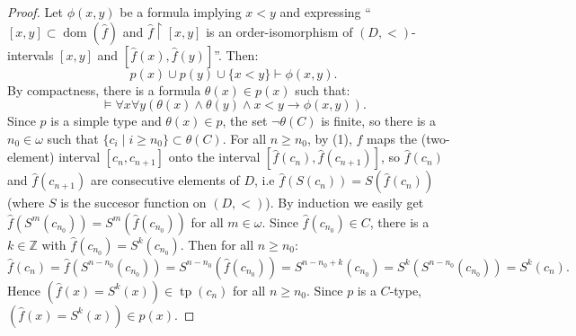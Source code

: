 \documentclass[10pt,a4paper]{amsart}
\theoremstyle{definition}
\DeclareMathOperator{\tp}{tp}
\DeclareMathOperator{\dom}{dom}
\begin{document}
\begin{proof}
Let $\phi(x,y)$ be a formula implying $x<y$ and expressing  ``$[x,y]\subset \dom (\hat f)$ and $\hat f\restriction[x,y]$ is an order-isomorphism of $(D,<)$-intervals $[x,y]$ and $[\hat f(x),\hat f(y)]$''. Then:
$$ p(x)\cup p(y)\cup\{x<y\}\vdash \phi(x,y).$$
By compactness, there is a formula $\theta(x)\in p(x)$   such that:
\begin{equation}
\models  \forall x\forall y  (\theta(x)\land \theta(y)\land x<y\rightarrow \phi(x,y)).
\end{equation}
Since $p$ is a simple type and $\theta(x)\in p$, the set $\lnot\theta(C)$ is finite, so there is a $n_0\in \omega$ such that $\{c_i\mid i\geq n_0\}\subset \theta(C)$. For all $n\geq n_0$, by (1),  $f$ maps the (two-element) interval $[c_n,c_{n+1}]$ onto the interval $[\hat f(c_n),\hat f(c_{n+1})]$, so  
$\hat f(c_n)$ and $\hat f(c_{n+1})$ are consecutive elements of $D$, i.e $\hat f(S(c_n))=S(\hat f(c_n))$ (where $S$ is the succesor function on $(D,<)$). By induction we easily get  $\hat f(S^m(c_{n_0}))=S^m(\hat f(c_{n_0}))$ for all $m\in \omega$. Since $\hat f(c_{n_0})\in C$, there is a $k\in \mathbb Z$ with $\hat f(c_{n_0})=S^k(c_{n_0})$. Then for all $n\geq n_0$: 
$$\hat f(c_n)=\hat f(S^{n-n_0}(c_{n_0}))=    S^{n-n_0}(\hat f(c_{n_0}))=S^{n-n_0+k}(c_{n_0})=S^k(S^{n-n_0}(c_{n_0}))=S^k(c_n).$$ 
Hence  $(\hat f(x)=S^k(x))\in \tp(c_n)$ for  all $n\geq n_0$.  Since $p$ is a $C$-type, $(\hat f(x)=S^k(x))\in p(x)$.
\end{proof}
\end{document}
